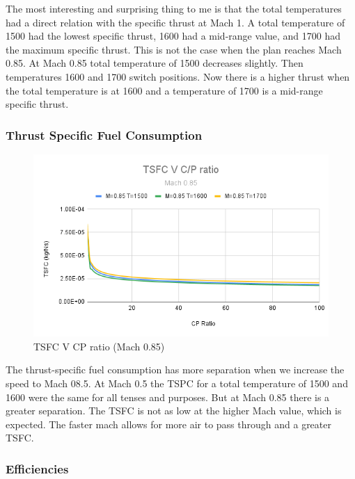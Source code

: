 \documentclass[12pt]{report}
\begin{document}
The most interesting and surprising thing to me is that the total temperatures had a direct relation with the specific thrust at Mach 1. A total temperature of 1500 had the lowest specific thrust, 1600 had a mid-range value, and 1700 had the maximum specific thrust. This is not the case when the plan reaches Mach 0.85. At Mach 0.85 total temperature of 1500 decreases slightly.  Then temperatures 1600 and 1700 switch positions.  Now there is a higher thrust when the total temperature is at 1600 and a temperature of 1700 is a mid-range specific thrust.



\subsubsection{Thrust Specific Fuel Consumption}

\begin{figure}[H]
    \centering
    \includegraphics[width=15.5 cm]{TSFC V C_P ratio (Mach 0.85).png}
    \caption{TSFC V CP ratio (Mach 0.85)}
    \label{fig:TSFC V C_P ratio (Mach 0.85)}
\end{figure}






The thrust-specific fuel consumption has more separation when we increase the speed to Mach 08.5. At Mach 0.5 the TSPC for a total temperature of 1500 and 1600 were the same for all tenses and purposes. But at Mach 0.85 there is a greater separation. The TSFC is not as low at the higher Mach value, which is expected.  The faster mach allows for more air to pass through and a greater TSFC.



\subsubsection{Efficiencies}
\end{document}
